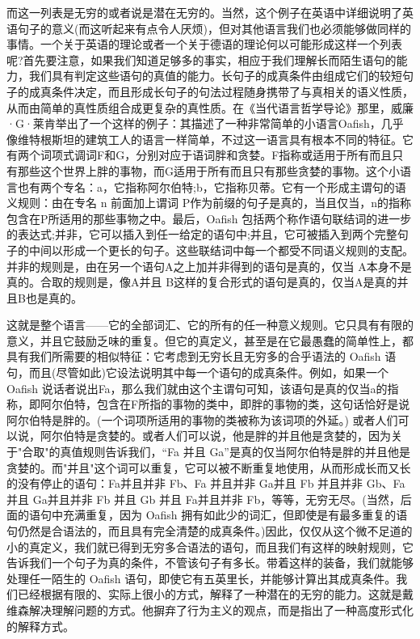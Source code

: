 \documentclass{article}
\begin{document}
{而这一列表是无穷的或者说是潜在无穷的。当然，这个例子在英语中详细说明了英语句子的意义(而这听起来有点令人厌烦)，但对其他语言我们也必须能够做同样的事情。一个关于英语的理论或者一个关于德语的理论何以可能形成这样一个列表呢?首先要注意，如果我们知道足够多的事实，相应于我们理解长而陌生语句的能力，我们具有判定这些语句的真值的能力。长句子的成真条件由组成它们的较短句子的成真条件决定，而且形成长句子的句法过程随身携带了与真相关的语义性质，从而由简单的真性质组合成更复杂的真性质。在《当代语言哲学导论》那里，威廉·G·莱肯举出了一个这样的例子：其描述了一种非常简单的小语言Oafish，几乎像维特根斯坦的建筑工人的语言一样简单，不过这一语言具有根本不同的特征。它有两个词项式调词F和G，分别对应于语词胖和贪婪。F指称或适用于所有而且只有那些这个世界上胖的事物，而G适用于所有而且只有那些贪婪的事物。这个小语言也有两个专名：a，它指称阿尔伯特;b，它指称贝蒂。它有一个形成主谓句的语义规则：由在专名 n 前面加上谓词 P作为前缀的句子是真的，当且仅当，n的指称包含在P所适用的那些事物之中。最后，Oafish 包括两个称作语句联结词的进一步的表达式;并非，它可以插入到任一给定的语句中;并且，它可被插入到两个完整句子的中间以形成一个更长的句子。这些联结词中每一个都受不同语义规则的支配。并非的规则是，由在另一个语句A之上加并非得到的语句是真的，仅当 A本身不是真的。合取的规则是，像A并且 B这样的复合形式的语句是真的，仅当A是真的并且B也是真的。

这就是整个语言——它的全部词汇、它的所有的任一种意义规则。它只具有有限的意义，并且它鼓励乏味的重复。但它的真定义，甚至是在它最愚蠢的简单性上，都具有我们所需要的相似特征：它考虑到无穷长且无穷多的合乎语法的 Oafish 语句，而且(尽管如此)它设法说明其中每一个语句的成真条件。例如，如果一个 Oafish 说话者说出Fa，那么我们就由这个主谓句可知，该语句是真的仅当a的指称，即阿尔伯特，包含在F所指的事物的类中，即胖的事物的类，这句话恰好是说阿尔伯特是胖的。(一个词项所适用的事物的类被称为该词项的外延。) 或者人们可以说，阿尔伯特是贪婪的。或者人们可以说，他是胖的并且他是贪婪的，因为关于"合取"的真值规则告诉我们，“Fa 并且 Ga”是真的仅当阿尔伯特是胖的并且他是贪婪的。而"并且"这个词可以重复，它可以被不断重复地使用，从而形成长而又长的没有停止的语句：Fa并且并非 Fb、Fa 并且并非 Ga并且 Fb 并且并非 Gb、Fa并且 Ga并且并非 Fb 并且 Gb 并且 Fa并且并非 Fb，等等，无穷无尽。(当然，后面的语句中充满重复，因为 Oafish 拥有如此少的词汇，但即使是有最多重复的语句仍然是合语法的，而且具有完全清楚的成真条件。)因此，仅仅从这个微不足道的小的真定义，我们就已得到无穷多合语法的语句，而且我们有这样的映射规则，它告诉我们一个句子为真的条件，不管该句子有多长。带着这样的装备，我们就能够处理任一陌生的 Oafish 语句，即使它有五英里长，并能够计算出其成真条件。我们已经根据有限的、实际上很小的方式，解释了一种潜在的无穷的能力。这就是戴维森解决理解问题的方式。他摒弃了行为主义的观点，而是指出了一种高度形式化的解释方式。 

}
\end{document}
